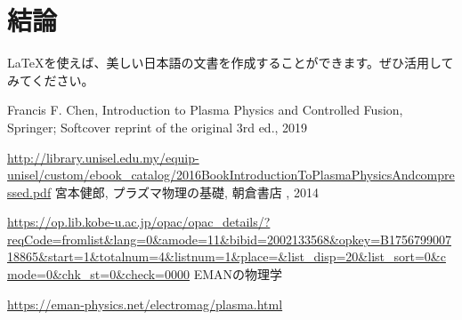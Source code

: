 \documentclass{ltjsarticle}
\numberwithin{equation}{section} %
\begin{document}
\section{結論}
LaTeXを使えば、美しい日本語の文書を作成することができます。ぜひ活用してみてください。




\begin{thebibliography}{99}
 Francis F. Chen, Introduction to Plasma Physics and Controlled Fusion, Springer; Softcover reprint of the original 3rd ed., 2019\par
\url{http://library.unisel.edu.my/equip-unisel/custom/ebook_catalog/2016BookIntroductionToPlasmaPhysicsAndcompressed.pdf}
 宮本健郎, プラズマ物理の基礎, 朝倉書店 , 2014\par
\url{https://op.lib.kobe-u.ac.jp/opac/opac_details/?reqCode=fromlist&lang=0&amode=11&bibid=2002133568&opkey=B175679900718865&start=1&totalnum=4&listnum=1&place=&list_disp=20&list_sort=0&cmode=0&chk_st=0&check=0000}
 EMANの物理学\par
\url{https://eman-physics.net/electromag/plasma.html}
\end{thebibliography}
\end{document}
